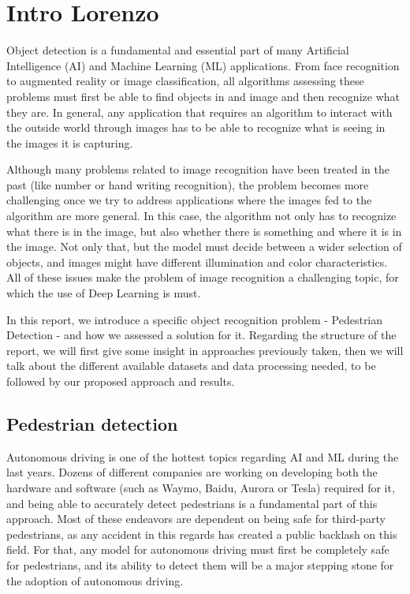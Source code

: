 \section{Intro Lorenzo}

Object detection is a fundamental and essential part of many Artificial Intelligence (AI) and Machine Learning (ML) applications. From face recognition to augmented reality or image classification, all algorithms assessing these problems must first be able to find objects in and image and then recognize what they are. In general, any application that requires an algorithm to interact with the outside world through images has to be able to recognize what is seeing in the images it is capturing.

Although many problems related to image recognition have been treated in the past (like number or hand writing recognition), the problem becomes more challenging once we try to address applications where the images fed to the algorithm are more general. In this case, the algorithm not only has to recognize what there is in the image, but also whether there is something and where it is in the image. Not only that, but the model must decide between a wider selection of objects, and images might have different illumination and color characteristics. All of these issues make the problem of image recognition a challenging topic, for which the use of Deep Learning is must.

In this report, we introduce a specific object recognition problem - Pedestrian Detection - and how we assessed a solution for it. Regarding the structure of the report, we will first give some insight in approaches previously taken, then we will talk about the different available datasets and data processing needed, to be followed by our proposed approach and results.
\subsection{Pedestrian detection}

Autonomous driving is one of the hottest topics regarding AI and ML during the last years. Dozens of different companies are working on developing both the hardware and software (such as Waymo, Baidu, Aurora or Tesla) required for it, and being able to accurately detect pedestrians is a fundamental part of this approach. Most of these endeavors are dependent on being safe for third-party pedestrians, as any accident in this regards has created a public backlash on this field. For that, any model for autonomous driving must first be completely safe for pedestrians, and its ability to detect them will be a major stepping stone for the adoption of autonomous driving.

